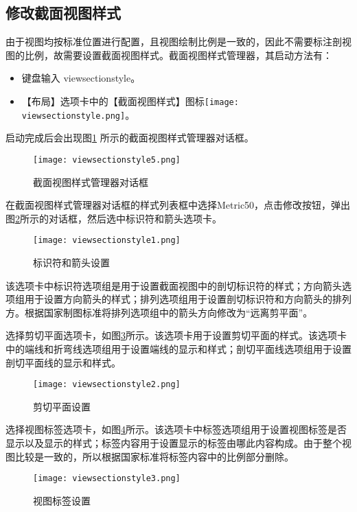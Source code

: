 \subsection{修改截面视图样式}

由于视图均按标准位置进行配置，且视图绘制比例是一致的，因此不需要标注剖视图的比例，故需要设置截面视图样式。截面视图样式管理器，其启动方法有：
\begin{itemize}
\item 键盘输入 viewsectionstyle。
\item 【布局】选项卡中的【截面视图样式】图标\texttt{[image: viewsectionstyle.png]}。
\end{itemize}
启动完成后会出现图\ref{fig:viewsectionstyle5} 所示的截面视图样式管理器对话框。
\clearpage
\begin{figure}[htbp]
\centering
\texttt{[image: viewsectionstyle5.png]}
\caption{截面视图样式管理器对话框}\label{fig:viewsectionstyle5}
\end{figure}

在截面视图样式管理器对话框的样式列表框中选择Metric50，点击修改按钮，弹出图\ref{fig:viewsectionstyle1}所示的对话框，然后选中标识符和箭头选项卡。
\begin{figure}[htbp]
\centering
\texttt{[image: viewsectionstyle1.png]}
\caption{标识符和箭头设置}\label{fig:viewsectionstyle1}
\end{figure}

该选项卡中标识符选项组是用于设置截面视图中的剖切标识符的样式；方向箭头选项组用于设置方向箭头的样式；排列选项组用于设置剖切标识符和方向箭头的排列方。根据国家制图标准将排列选项组中的箭头方向修改为“远离剪平面”。

选择剪切平面选项卡，如图\ref{fig:viewsectionstyle2}所示。该选项卡用于设置剪切平面的样式。该选项卡中的端线和折弯线选项组用于设置端线的显示和样式；剖切平面线选项组用于设置剖切平面线的显示和样式。
\begin{figure}[htbp]
\centering
\texttt{[image: viewsectionstyle2.png]}
\caption{剪切平面设置}\label{fig:viewsectionstyle2}
\end{figure}

选择视图标签选项卡，如图\ref{fig:viewsectionstyle3}所示。该选项卡中标签选项组用于设置视图标签是否显示以及显示的样式；标签内容用于设置显示的标签由哪此内容构成。由于整个视图比较是一致的，所以根据国家标准将标签内容中的比例部分删除。
\begin{figure}[htbp]
\centering
\texttt{[image: viewsectionstyle3.png]}
\caption{视图标签设置}\label{fig:viewsectionstyle3}
\end{figure}

